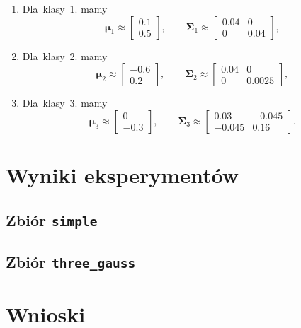 \documentclass[11pt,a4paper]{article}
\begin{document}
\begin{enumerate}
    \item Dla~klasy~1. mamy
    $$
        \boldsymbol\mu_1 \approx \begin{bmatrix} 0.1 \\ 0.5 \end{bmatrix},
        \qquad
        \boldsymbol\Sigma_1 \approx \begin{bmatrix} 0.04 & 0 \\ 0 & 0.04 \end{bmatrix},
    $$
    \item Dla~klasy~2. mamy
    $$
        \boldsymbol\mu_2 \approx \begin{bmatrix} -0.6 \\ 0.2 \end{bmatrix},
        \qquad
        \boldsymbol\Sigma_2 \approx \begin{bmatrix} 0.04 & 0 \\ 0 & 0.0025 \end{bmatrix},
    $$
    \item Dla~klasy~3. mamy
    $$
        \boldsymbol\mu_3 \approx \begin{bmatrix} 0 \\ -0.3 \end{bmatrix},
        \qquad
        \boldsymbol\Sigma_3 \approx \begin{bmatrix} 0.03 & -0.045 \\ -0.045 & 0.16 \end{bmatrix}.
    $$
\end{enumerate}


\section{Wyniki eksperymentów}

\subsection{Zbiór {\tt simple}}

\subsection{Zbiór {\tt three\_gauss}}

\section{Wnioski}
\end{document}
